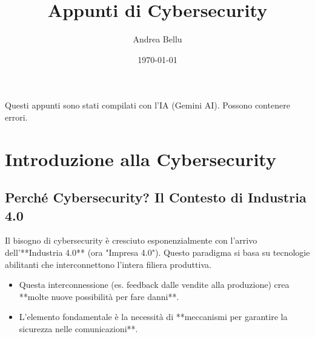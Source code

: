 \documentclass[a4paper,12pt]{article}
\title{\vspace{-2em}\textbf{\Huge Appunti di Cybersecurity}\vspace{-0.5em}}
\author{\Large Andrea Bellu}
\date{\today}
\begin{document}
\noindent
\maketitle

{\scriptsize Questi appunti sono stati compilati con l’IA (Gemini AI). Possono contenere errori.}

\tableofcontents
\newpage

\section{Introduzione alla Cybersecurity}

\subsection{Perché Cybersecurity? Il Contesto di Industria 4.0}
Il bisogno di cybersecurity è cresciuto esponenzialmente con l'arrivo dell'**Industria 4.0** (ora "Impresa 4.0"). Questo paradigma si basa su tecnologie abilitanti che interconnettono l'intera filiera produttiva.
\begin{itemize}
    \item Questa interconnessione (es. feedback dalle vendite alla produzione) crea **molte nuove possibilità per fare danni**.
    \item L'elemento fondamentale è la necessità di **meccanismi per garantire la sicurezza nelle comunicazioni**.
\end{itemize}
\end{document}
